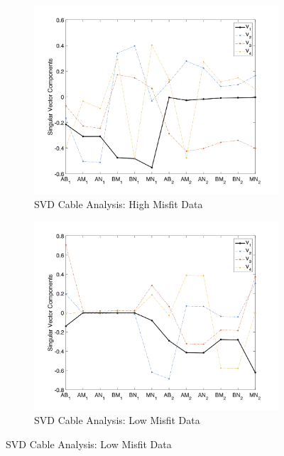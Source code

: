 \documentclass[final,authoryear,5p,times,twocolumn]{elsarticle}
\begin{document}
\begin{figure}[!ht]
   \vspace{1em}

   \begin{subfigure}[b]{0.475\linewidth}
       \centering
       \includegraphics[trim=1.6cm 0.65cm 2cm 1.4cm, clip=true, width=\linewidth]{./Figures/Fig7c.png}
       \caption{SVD Cable Analysis: High Misfit Data}
       \label{fig:DataQC_SVD_Cable_Bad}
   \end{subfigure}
   \hfill
   \begin{subfigure}[b]{0.475\linewidth}
       \centering
       \includegraphics[trim=1.6cm 0.65cm 2cm 1.4cm, clip=true, width=\linewidth]{./Figures/Fig7d.png}
       \caption{SVD Cable Analysis: Low Misfit Data}
       \label{fig:DataQC_SVD_Cable_Good}
   \end{subfigure}


\end{figure}
\end{document}

